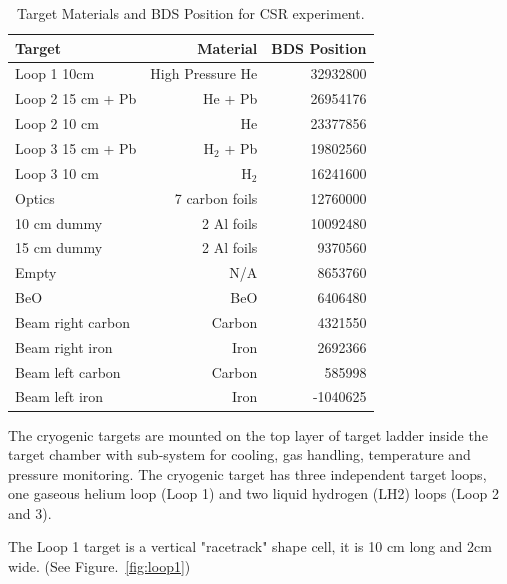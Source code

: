 \begin{table}[tb!]
\centering
\begin{tabular}{lrr}
\hline
Target            & Material         & BDS Position \\ \hline
Loop 1 10cm       & High Pressure He & 32932800     \\
Loop 2 15 cm + Pb & He + Pb          & 26954176     \\
Loop 2 10 cm      & He               & 23377856     \\ \hline
Loop 3 15 cm + Pb & H$_2$ + Pb       & 19802560     \\
Loop 3 10 cm      & H$_2$            & 16241600     \\ \hline
Optics            & 7 carbon foils   & 12760000     \\
10 cm dummy       & 2 Al foils       & 10092480     \\
15 cm dummy       & 2 Al foils       & 9370560      \\
Empty             & N/A              & 8653760      \\
BeO               & BeO              & 6406480      \\
Beam right carbon & Carbon           & 4321550      \\
Beam right iron   & Iron             & 2692366      \\
Beam left carbon  & Carbon           & 585998       \\
Beam left iron    & Iron             & -1040625     \\ \hline
\end{tabular}
\caption[Target Materials and BDS Position.]{Target Materials and BDS Position for CSR experiment.}\label{tab:tgmat-BDS}
\end{table}

The cryogenic targets are mounted on the top layer of target ladder inside the target chamber with sub-system for cooling,
gas handling, temperature and pressure monitoring. 
The cryogenic target has three independent target loops, one gaseous helium loop (Loop 1) and two liquid hydrogen (LH2)
loops (Loop 2 and 3).

The Loop 1 target is a vertical "racetrack" shape cell, it is 10 cm long and 2cm wide. (See Figure.~\ref{fig:loop1})

